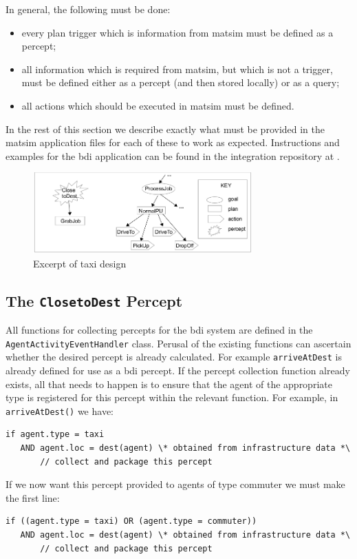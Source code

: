 In general, the following must be done:
\begin{itemize}\styleItemize
\item every plan trigger which is information from \gls{matsim} must
be defined as a percept; 
\item all information which is required from
\gls{matsim}, but which is not a trigger, must be defined either as a
percept (and then stored locally) or as a query; 
\item all actions which should be executed in \gls{matsim} must be defined.
\end{itemize}
%
In the rest of this section we describe exactly what must be provided
in the \gls{matsim} application files for each of these to work as
expected. Instructions and examples for the \gls{bdi} application can be
found in the integration repository at \url{}.

\begin{figure}
\begin{center}
\includegraphics[width=0.75\textwidth]{extending/figures/bdi/fig-taxi-gptree.jpg}
\caption{Excerpt of taxi design}
\label{taxigptree}
\end{center}
\end{figure}

\subsection{The \lstinline{ClosetoDest} Percept}
All functions for collecting percepts for the \gls{bdi} system are defined
in the \lstinline{AgentActivityEventHandler} class. Perusal of the existing
functions can ascertain whether the desired percept is already
calculated. For example \lstinline{arriveAtDest} is already defined for use as a
\gls{bdi} percept. 
%
If the percept collection function already exists, all that needs to
happen is to ensure that the agent of the appropriate type is
registered for this percept within the relevant function.
For example, in \lstinline{arriveAtDest()} we have:
\begin{lstlisting}
if agent.type = taxi
   AND agent.loc = dest(agent) \* obtained from infrastructure data *\
       // collect and package this percept
\end{lstlisting}
If we now want this percept provided to agents of type commuter we
must make the first line:
\begin{lstlisting}
if ((agent.type = taxi) OR (agent.type = commuter))
   AND agent.loc = dest(agent) \* obtained from infrastructure data *\
       // collect and package this percept
\end{lstlisting}

